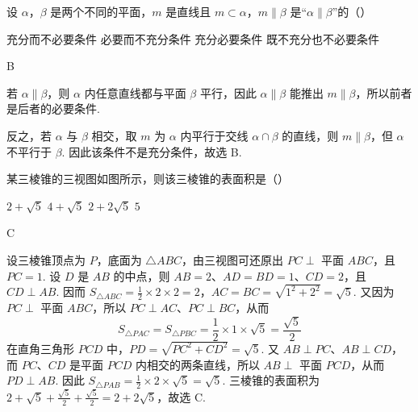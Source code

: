 \begin{problem}
设 \(\alpha\)，\(\beta\) 是两个不同的平面，\(m\) 是直线且 \(m \subset \alpha\)，\(m \parallel \beta\) 是“\(\alpha \parallel \beta\)”的（\quad）

\choices
    {充分而不必要条件}
    {必要而不充分条件}
    {充分必要条件}
    {既不充分也不必要条件}

\begin{answer}
B
\end{answer}

\begin{solution}
若 \(\alpha\parallel\beta\)，则 \(\alpha\) 内任意直线都与平面 \(\beta\) 平行，因此 \(\alpha\parallel\beta\) 能推出 \(m\parallel\beta\)，所以前者是后者的必要条件.

反之，若 \(\alpha\) 与 \(\beta\) 相交，取 \(m\) 为 \(\alpha\) 内平行于交线 \(\alpha\cap\beta\) 的直线，则 \(m\parallel\beta\)，但 \(\alpha\) 不平行于 \(\beta\). 因此该条件不是充分条件，故选 B.
\end{solution}
\end{problem}

\begin{problem}
某三棱锥的三视图如图所示，则该三棱锥的表面积是（\quad）


\choices
    {\(2 + \sqrt{5}\)}
    {\(4 + \sqrt{5}\)}
    {\(2 + 2\sqrt{5}\)}
    {\(5\)}

\begin{answer}
C
\end{answer}

\begin{solution}
设三棱锥顶点为 \(P\)，底面为 \(\triangle ABC\)，由三视图可还原出 \(PC\perp\) 平面 \(ABC\)，且 \(PC=1\). 设 \(D\) 是 \(AB\) 的中点，则 \(AB=2\)、\(AD=BD=1\)、\(CD=2\)，且 \(CD\perp AB\). 因而
\(S_{\triangle ABC}=\frac{1}{2}\times2\times2=2\)，\(AC=BC=\sqrt{1^2+2^2}=\sqrt5\).
又因为 \(PC\perp\) 平面 \(ABC\)，所以 \(PC\perp AC\)、\(PC\perp BC\)，从而
\[
S_{\triangle PAC}=S_{\triangle PBC}=\frac{1}{2}\times1\times\sqrt5=\frac{\sqrt5}{2}
\]
在直角三角形 \(PCD\) 中，\(PD=\sqrt{PC^2+CD^2}=\sqrt5\). 又 \(AB\perp PC\)、\(AB\perp CD\)，而 \(PC\)、\(CD\) 是平面 \(PCD\) 内相交的两条直线，所以 \(AB\perp\) 平面 \(PCD\)，从而 \(PD\perp AB\). 因此 \(S_{\triangle PAB}=\frac{1}{2}\times2\times\sqrt5=\sqrt5\). 三棱锥的表面积为 \(2+\sqrt5+\frac{\sqrt5}{2}+\frac{\sqrt5}{2}=2+2\sqrt5\)，故选 C.
\end{solution}
\end{problem}


